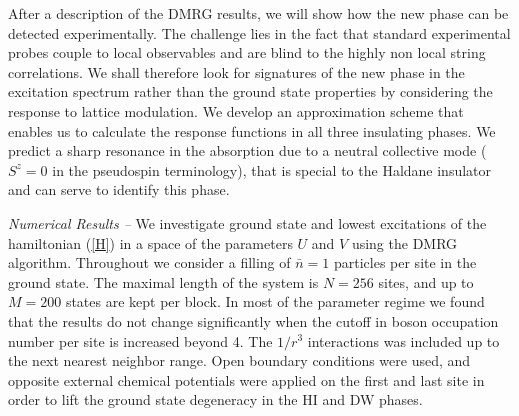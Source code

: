 \documentclass[prb,twocolumn,,amsmath,amssymb,floatfix]{revtex4}
\begin{document}
After a description of the DMRG results, we will show how the new
phase can be detected experimentally. The challenge lies in the fact
that standard experimental probes couple to local observables and
are blind to the highly non local string correlations. We shall
therefore look for signatures of the new phase in the excitation
spectrum rather than the ground state properties by considering the
response to lattice modulation\cite{Esslinger}. We develop an
approximation scheme that enables us to calculate the response
functions in all three insulating phases. We predict a sharp
resonance in the absorption due to a neutral collective mode
($S^z=0$ in the pseudospin terminology), that is special to the
Haldane insulator and can serve to identify this phase.

{\em Numerical Results --} We investigate ground state and lowest
excitations of the hamiltonian (\ref{H}) in a space of the
parameters $U$ and $V$ using the DMRG algorithm\cite{white}.
Throughout we consider a filling of $\bar n=1$ particles per site in
the ground state. The maximal length of the system is $N=256$ sites,
and up to $M=200$ states are kept per block. In most of the
parameter regime we found that the results do not change
significantly when the cutoff in boson occupation number per site is
increased beyond 4. The $1/r^3$ interactions was included up to the
next nearest neighbor range. Open boundary conditions were used, and
opposite external chemical potentials were applied on the first and
last site in order to lift the ground state degeneracy in the HI and
DW phases.
\end{document}
